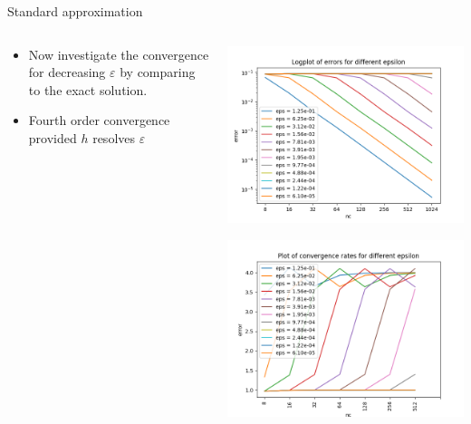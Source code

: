 \documentclass{beamer}
\renewcommand{\epsilon}{\varepsilon}
\begin{document}
\begin{frame}[t]{Standard approximation}
\begin{columns}
    \begin{column}[c]{.5\textwidth}
      \begin{itemize}
      \item Now investigate the convergence for decreasing $\epsilon$ by comparing to the exact solution.
      \item Fourth order convergence provided $h$ resolves $\epsilon$
    \end{itemize}
  \end{column}
  \begin{column}[c]{.5\textwidth}

    \includegraphics[width=0.85\linewidth]{one_dim_h_eps1.png}

    \includegraphics[width=0.85\linewidth]{one_dim_h_eps2.png}
 \end{column}
\end{columns}
\end{frame}
\end{document}
